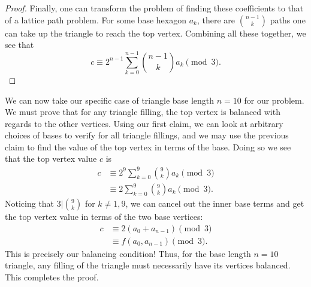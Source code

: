 \begin{solution}{3}
\begin{proof}
        Finally, one can transform the problem of finding these coefficients to that of a lattice path problem. For some base hexagon \( a_k \), there are \( \binom{n - 1}{k} \) paths one can take up the triangle to reach the top vertex. Combining all these together, we see that
        \[
            c \equiv 2^{n-1} \sum_{k = 0}^{n - 1} \binom{n - 1}{k} a_k \pmod{3}
        .\]
    \end{proof}
    We can now take our specific case of triangle base length \( n = 10 \) for
    our problem. We must prove that for any triangle filling, the top vertex is
    balanced with regards to the other vertices. Using our first claim, we can
    look at arbitrary choices of bases to verify for all triangle fillings, and
    we may use the previous claim to find the value of the top vertex in terms
    of the base. Doing so we see that the top vertex value \( c \) is
    \begin{align*}
        c &\equiv 2^9 \sum_{k = 0}^{9} \binom{9}{k} a_k \pmod{3} \\
        &\equiv 2 \sum_{k = 0}^{9} \binom{9}{k} a_k \pmod{3}
    .\end{align*}
    Noticing that \( 3 | \binom{9}{k} \) for \( k \ne 1, 9 \), we can cancel
    out the inner base terms and get the top vertex value in terms of the two
    base vertices:
    \begin{align*}
        c &\equiv 2(a_0 + a_{n-1}) \pmod{3} \\
        &\equiv f(a_0, a_{n-1}) \pmod{3}
    .\end{align*}
    This is precisely our balancing condition! Thus, for the base length \( n =
    10 \) triangle, any filling of the triangle must necessarily have its
    vertices balanced. This completes the proof.
\end{solution}

